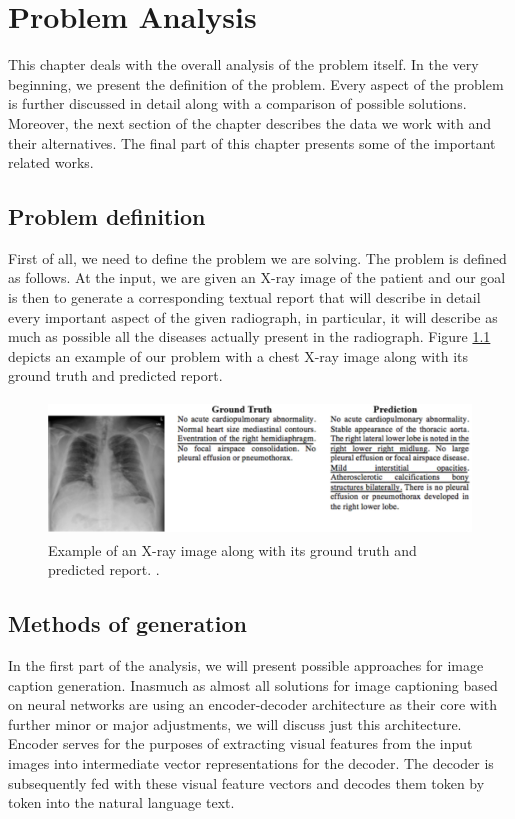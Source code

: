 \chapter{Problem Analysis}
This chapter deals with the overall analysis of the problem itself. In the very beginning, we present the definition of the problem. Every aspect of the problem is further discussed in detail along with a comparison of possible solutions. Moreover, the next section of the chapter describes the data we work with and their alternatives. The final part of this chapter presents some of the important related works.

\section{Problem definition}
First of all, we need to define the problem we are solving. The problem is defined as follows. At the input, we are given an X-ray image of the patient and our goal is then to generate a corresponding textual report that will describe in detail every important aspect of the given radiograph, in particular, it will describe as much as possible all the diseases actually present in the radiograph. Figure \hyperref[fig01:ProblemExample]{1.1} depicts an example of our problem with a chest X-ray image along with its ground truth and predicted report. 

\begin{figure}[h]\centering
\includegraphics[width=120mm, height=36mm]{../img/ProblemExample}
\caption{Example of an X-ray image along with its ground truth and predicted report. \citet{jing2017automatic}.}
\label{fig01:ProblemExample}
\end{figure}

\section{Methods of generation}
\label{sec:methodsOfGeneration}
In the first part of the analysis, we will present possible approaches for image caption generation. Inasmuch as almost all solutions for image captioning based on neural networks are using an encoder-decoder architecture as their core with further minor or major adjustments, we will discuss just this architecture. Encoder serves for the purposes of extracting visual features from the input images into intermediate vector representations for the decoder. The decoder is subsequently fed with these visual feature vectors and decodes them token by token into the natural language text.\\

